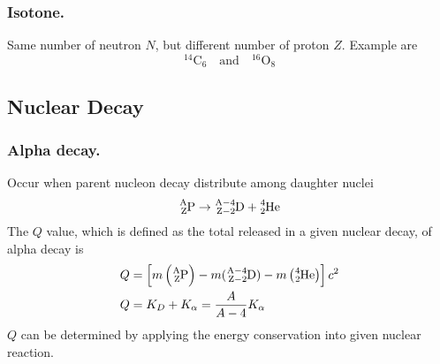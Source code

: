 \documentclass[../../../main.tex]{subfiles}
\begin{document}
\subsubsection*{Isotone.} Same number of neutron $N$, but different number of proton $Z$. Example are
\begin{equation*}
    ^{14}\text{C}_6\quad\text{and}\quad    ^{16}\text{O}_8
\end{equation*}


\subsection*{Nuclear Decay}

\subsubsection*{Alpha decay.} Occur when parent nucleon decay distribute among daughter nuclei 
\begin{equation*}
    \ce{^A_ZP}\rightarrow\ce{^{A-4}_{Z-2}D}+\ce{^4_2He}
\end{equation*}
The $Q$ value, which is defined as the total released in a given nuclear decay, of alpha decay is 
\begin{align*}
    Q&=\left[m\left(\ce{^A_ZP}\right)-m(\ce{^{A-4}_{Z-2}D})-m\left(\ce{^4_2He}\right)\right]c^2\\
    Q&=K_D+K_\alpha=\frac{A}{A-4}K_\alpha
\end{align*}
$Q$ can be determined by applying the energy conservation into given nuclear reaction. 
\end{document}
